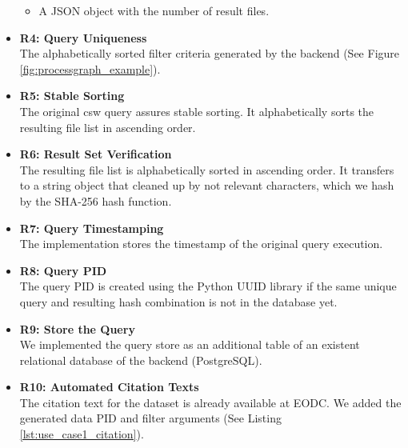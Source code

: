 \documentclass[draft,final]{vutinfth} %
\begin{document}
\begin{itemize}
\begin{itemize}
		\item A JSON object with the number of result files.
	\end{itemize}
	\item \textbf{R4: Query Uniqueness} \\
	The alphabetically sorted {filter criteria} generated by the backend (See Figure \ref{fig:processgraph_example}).
	\item \textbf{R5: Stable Sorting} \\
	The original \acrshort{csw} query assures stable sorting. It alphabetically sorts the resulting file list in ascending order.
	\item \textbf{R6: Result Set Verification} \\
	The resulting file list is alphabetically sorted in ascending order. It transfers to a string object that cleaned up by not relevant characters, which we hash by the SHA-256 hash function. 
	\item \textbf{R7: Query Timestamping} \\
	The implementation stores the timestamp of the original query execution. 
	\item \textbf{R8: Query PID}\\
	The query PID is created using the Python UUID library if the same unique query and resulting hash combination is not in the database yet.
	\item \textbf{R9: Store the Query} \\
	We implemented the query store as an additional table of an existent relational database of the backend (PostgreSQL). 
	\item \textbf{R10: Automated Citation Texts} \\
	The citation text for the dataset is already available at EODC. We added the generated data PID and filter arguments {(See Listing \ref{lst:use_case1_citation})}. %
	

\end{itemize}
\end{document}
